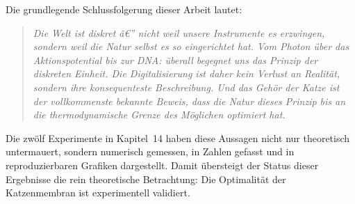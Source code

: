 ﻿\documentclass[12pt,a4paper,titlepage]{report}
\begin{document}
Die grundlegende Schlussfolgerung dieser Arbeit lautet:

\begin{quote}
	\itshape
	Die Welt ist diskret â€” nicht weil unsere Instrumente es erzwingen,
	sondern weil die Natur selbst es so eingerichtet hat.
	Vom Photon über das Aktionspotential bis zur DNA: überall begegnet uns
	das Prinzip der diskreten Einheit.
	Die Digitalisierung ist daher kein Verlust an Realität, sondern
	ihre konsequenteste Beschreibung.
	Und das Gehör der Katze ist der vollkommenste bekannte Beweis,
	dass die Natur dieses Prinzip bis an die thermodynamische Grenze
	des Möglichen optimiert hat.
\end{quote}

Die zwölf Experimente in Kapitel~14 haben diese Aussagen nicht nur
theoretisch untermauert, sondern numerisch gemessen, in Zahlen gefasst
und in reproduzierbaren Grafiken dargestellt.
Damit übersteigt der Status dieser Ergebnisse die rein theoretische
Betrachtung: Die Optimalität der Katzenmembran ist experimentell validiert.
\end{document}
